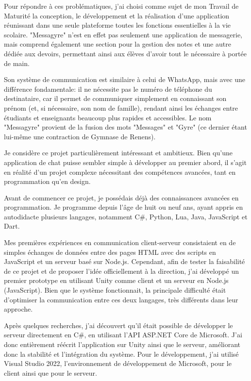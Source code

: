 \documentclass[12pt]{report}
\begin{document}
	Pour répondre à ces problématiques, j’ai choisi comme sujet de mon Travail de Maturité la conception, le développement et la réalisation d’une application réunissant dans une seule plateforme toutes les fonctions essentielles à la vie scolaire. "Messagyre" n’est en effet pas seulement une application de messagerie, mais comprend également une section pour la gestion des notes et une autre dédiée aux devoirs, permettant ainsi aux élèves d’avoir tout le nécessaire à portée de main.
	
	Son système de communication est similaire à celui de WhatsApp\supercite{whatsapp}, mais avec une différence fondamentale: il ne nécessite pas le numéro de téléphone du destinataire, car il permet de communiquer simplement en connaissant son prénom (et, si nécessaire, son nom de famille), rendant ainsi les échanges entre étudiants et enseignants beaucoup plus rapides et accessibles. Le nom "Messagyre" provient de la fusion des mots "Messages" et "Gyre" (ce dernier étant lui-même une contraction de Gymnase de Renens).
	
	Je considère ce projet particulièrement intéressant et ambitieux. Bien qu’une application de chat puisse sembler simple à développer au premier abord, il s’agit en réalité d’un projet complexe nécessitant des compétences avancées, tant en programmation qu’en design.
	
	Avant de commencer ce projet, je possédais déjà des connaissances avancées en programmation. Je programme depuis l’âge de huit ou neuf ans, ayant appris en autodidacte plusieurs langages, notamment C\#\supercite{csharp}, Python, Lua, Java, JavaScript\supercite{nodejs} et Dart\supercite{dart}.
	
	Mes premières expériences en communication client-serveur consistaient en de simples échanges de données entre des pages HTML avec des scripts en JavaScript\supercite{nodejs} et un serveur basé sur Node.js\supercite{nodejs}. Cependant, afin de tester la faisabilité de ce projet et de proposer l’idée officiellement à la direction, j’ai développé un premier prototype en utilisant Unity\supercite{visualstudio} comme client et un serveur en Node.js (JavaScript\supercite{nodejs}). Bien que le système fonctionnait, la principale difficulté était d’optimiser la communication entre ces deux langages, très différents dans leur approche.
	
	Après quelques recherches, j’ai découvert qu’il était possible de développer le serveur directement en C\#\supercite{csharp}, en utilisant l’API ASP.NET Core\supercite{aspnetcore} de Microsoft. J’ai donc entièrement réécrit l’application sur Unity\supercite{visualstudio} ainsi que le serveur, améliorant donc la stabilité et l’intégration du système. Pour le développement, j’ai utilisé Visual Studio 2022\supercite{visualstudio}, l’environnement de développement de Microsoft, pour le client ainsi que pour le serveur.
	
\end{document}

